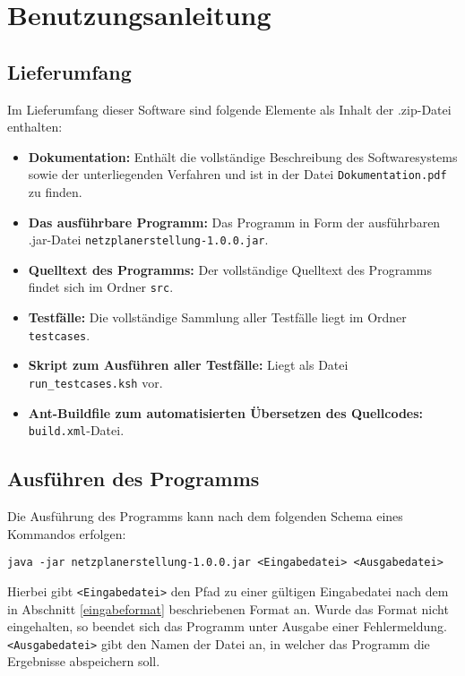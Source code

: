 \chapter{Benutzungsanleitung}
\label{Benutzeranleitung}

\section{Lieferumfang}

Im Lieferumfang dieser Software sind folgende Elemente als Inhalt der
.zip-Datei enthalten:
\begin{itemize}
  \item \textbf{Dokumentation:} Enth\"alt die vollst\"andige
    Beschreibung des Softwaresystems sowie der unterliegenden
    Verfahren und ist in
    der Datei \texttt{Dokumentation.pdf} zu finden.
  \item \textbf{Das ausf\"uhrbare Programm:} Das Programm in Form
    der ausf\"uhrbaren .jar-Datei
    \texttt{netzplanerstellung-1.0.0.jar}.
  \item \textbf{Quelltext des Programms:} Der vollst\"andige Quelltext
    des Programms findet sich im Ordner \texttt{src}.
  \item \textbf{Testf\"alle:} Die vollst\"andige Sammlung aller
    Testf\"alle liegt im Ordner \texttt{testcases}.
  \item \textbf{Skript zum Ausf\"uhren aller Testf\"alle:} Liegt als
    Datei \texttt{run\_testcases.ksh} vor.
  \item \textbf{Ant-Buildfile zum automatisierten \"Ubersetzen des
    Quellcodes:} \texttt{build.xml}-Datei.
\end{itemize}

\section{Ausf\"uhren des Programms}

Die Ausf\"uhrung des Programms kann nach dem folgenden Schema eines
Kommandos erfolgen:
\begin{verbatim}
java -jar netzplanerstellung-1.0.0.jar <Eingabedatei> <Ausgabedatei>
\end{verbatim}
Hierbei gibt \texttt{<Eingabedatei>} den Pfad zu einer g\"ultigen
Eingabedatei nach dem in Abschnitt \ref{eingabeformat} beschriebenen
Format an. Wurde das Format nicht eingehalten, so beendet sich das
Programm unter Ausgabe einer Fehlermeldung.
\texttt{<Ausgabedatei>} gibt den Namen der Datei an, in welcher das
Programm die Ergebnisse abspeichern soll.

